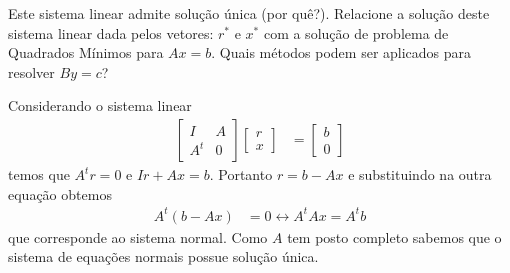 \begin{questions}
    Este sistema linear admite solu\c{c}\~{a}o \'{u}nica (por qu\^{e}?). Relacione a solu\c{c}\~{a}o deste sistema linear dada pelos vetores: $r^*$ e $x^*$ com a solu\c{c}\~{a}o de problema de Quadrados M\'{i}nimos para $A x = b$. Quais m\'{e}todos podem ser aplicados para resolver $B y = c$?
    \begin{solution}
        Considerando o sistema linear
        \begin{align*}
            \begin{bmatrix}
                I & A \\
                A^t & 0
            \end{bmatrix} \begin{bmatrix}
                r \\
                x
            \end{bmatrix} &= \begin{bmatrix}
                b \\
                0
            \end{bmatrix}
        \end{align*}
        temos que $A^t r = 0$ e $I r + A x = b$. Portanto $r = b - A x$ e substituindo na outra equa\c{c}\~{a}o obtemos
        \begin{align*}
            A^t \left( b - A x \right) &= 0 \leftrightarrow A^t A x = A^tb
        \end{align*}
        que corresponde ao sistema normal. Como $A$ tem posto completo sabemos que o sistema de equa\c{c}\~{o}es normais possue solu\c{c}\~{a}o \'{u}nica.
    \end{solution}


\end{questions}
